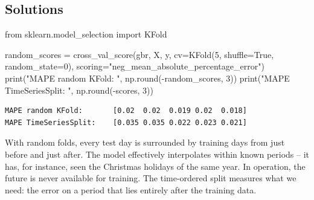 \documentclass[
  letterpaper,
  DIV=11,
  numbers=noendperiod]{scrreprt}
\newenvironment{Shaded}{\begin{snugshade}}{\end{snugshade}}
\newcommand{\BuiltInTok}[1]{\textcolor[rgb]{0.00,0.23,0.31}{#1}}
\newcommand{\DecValTok}[1]{\textcolor[rgb]{0.68,0.00,0.00}{#1}}
\newcommand{\ImportTok}[1]{\textcolor[rgb]{0.00,0.46,0.62}{#1}}
\newcommand{\NormalTok}[1]{\textcolor[rgb]{0.00,0.23,0.31}{#1}}
\newcommand{\OperatorTok}[1]{\textcolor[rgb]{0.37,0.37,0.37}{#1}}
\newcommand{\StringTok}[1]{\textcolor[rgb]{0.13,0.47,0.30}{#1}}
\newcommand{\VariableTok}[1]{\textcolor[rgb]{0.07,0.07,0.07}{#1}}
\begin{document}
\subsection{Solutions}\label{solutions-11}

\begin{tcolorbox}[enhanced jigsaw, left=2mm, title=\textcolor{quarto-callout-caution-color}{\faFire}\hspace{0.5em}{Solution to Exercise 1}, opacityback=0, breakable, rightrule=.15mm, arc=.35mm, toptitle=1mm, colbacktitle=quarto-callout-caution-color!10!white, opacitybacktitle=0.6, coltitle=black, colframe=quarto-callout-caution-color-frame, bottomrule=.15mm, leftrule=.75mm, bottomtitle=1mm, titlerule=0mm, toprule=.15mm, colback=white]

\begin{Shaded}
\begin{Highlighting}[]
\ImportTok{from}\NormalTok{ sklearn.model\_selection }\ImportTok{import}\NormalTok{ KFold}

\NormalTok{random\_scores }\OperatorTok{=}\NormalTok{ cross\_val\_score(gbr, X, y, cv}\OperatorTok{=}\NormalTok{KFold(}\DecValTok{5}\NormalTok{, shuffle}\OperatorTok{=}\VariableTok{True}\NormalTok{, random\_state}\OperatorTok{=}\DecValTok{0}\NormalTok{),}
\NormalTok{                                scoring}\OperatorTok{=}\StringTok{"neg\_mean\_absolute\_percentage\_error"}\NormalTok{)}
\BuiltInTok{print}\NormalTok{(}\StringTok{"MAPE random KFold:      "}\NormalTok{, np.}\BuiltInTok{round}\NormalTok{(}\OperatorTok{{-}}\NormalTok{random\_scores, }\DecValTok{3}\NormalTok{))}
\BuiltInTok{print}\NormalTok{(}\StringTok{"MAPE TimeSeriesSplit:   "}\NormalTok{, np.}\BuiltInTok{round}\NormalTok{(}\OperatorTok{{-}}\NormalTok{scores, }\DecValTok{3}\NormalTok{))}
\end{Highlighting}
\end{Shaded}

\begin{verbatim}
MAPE random KFold:       [0.02  0.02  0.019 0.02  0.018]
MAPE TimeSeriesSplit:    [0.035 0.035 0.022 0.023 0.021]
\end{verbatim}

With random folds, every test day is surrounded by training days from
just before and just after. The model effectively interpolates within
known periods -- it has, for instance, seen the Christmas holidays of
the same year. In operation, the future is never available for training.
The time-ordered split measures what we need: the error on a period that
lies entirely after the training data.

\end{tcolorbox}
\end{document}
